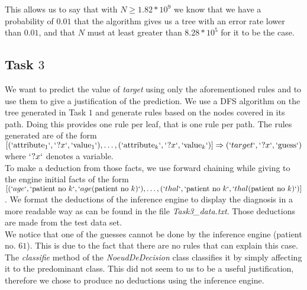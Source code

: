 \documentclass[9pt]{extarticle}
\begin{document}
	
	

	

This allows us to say that with $N\geq1.82*10^9$ we know that we have a probability of $0.01$ that the algorithm gives us a tree with an error rate lower than $0.01$, and that $N$ must at least greater than $8.28*10^5$ for it to be the case.

\subsection{Task $3$}
	We want to predict the value of \emph{target} using only the aforementioned rules and to use them to give a justification of the prediction.
	We use a DFS algorithm on the tree generated in Task $1$ and generate rules based on the nodes covered in its path. Doing this provides one rule per leaf, that is one rule per path. The rules generated are of the form $ [(`\mathrm{attribute}_1`,` ?x`, `\mathrm{value}_1`),\ldots,(`\mathrm{attribute}_k`,` ?x`, `\mathrm{value}_k`)]\Rightarrow(`target`, `?x` , `\mathrm{guess}`)$ where $`?x`$ denotes a variable.\\
	To make a deduction from those facts, we use forward chaining while giving to the engine initial facts of the form $[(`age`, `\mathrm{patient\ no}\ k`, `age(\mathrm{patient\ no}\ k)`),\ldots,(`thal`, `\mathrm{patient\ no}\ k`, `thal(\mathrm{patient\ no}\ k)`)]$. We format the deductions of the inference engine to display the diagnosis in a more readable way as can be found in the file \emph{Task3\_data.txt}. Those deductions are made from the test data set.\\
	We notice that one of the guesses cannot be done by the inference engine (patient no. $61$). This is due to the fact that there are no rules that can explain this case. The \emph{classifie} method of the \emph{NoeudDeDecision} class classifies it by simply affecting it to the predominant class. This did not seem to us to be a useful justification, therefore we chose to produce no deductions using the inference engine.
	
\end{document}
